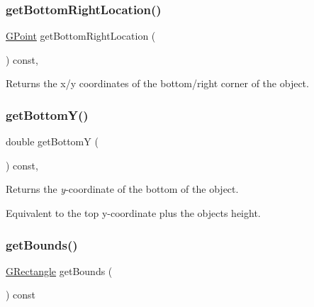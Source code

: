 \subsubsection{\texorpdfstring{get\+Bottom\+Right\+Location()}{getBottomRightLocation()}}
{\footnotesize\ttfamily \mbox{\hyperlink{classGPoint}{G\+Point}} get\+Bottom\+Right\+Location (\begin{DoxyParamCaption}{ }\end{DoxyParamCaption}) const\hspace{0.3cm}{\ttfamily [virtual]}, {\ttfamily [inherited]}}



Returns the x/y coordinates of the bottom/right corner of the object. 

\mbox{\label{classGObject_a4316a2406c18e1c6d061fe51fd355490}} 
\subsubsection{\texorpdfstring{get\+Bottom\+Y()}{getBottomY()}}
{\footnotesize\ttfamily double get\+BottomY (\begin{DoxyParamCaption}{ }\end{DoxyParamCaption}) const\hspace{0.3cm}{\ttfamily [virtual]}, {\ttfamily [inherited]}}



Returns the {\itshape y}-\/coordinate of the bottom of the object. 

Equivalent to the top y-\/coordinate plus the object\textquotesingle{}s height. \mbox{\label{classGText_a2f46ec8a3b533c690b3b3e56d4f34afe}} 
\subsubsection{\texorpdfstring{get\+Bounds()}{getBounds()}}
{\footnotesize\ttfamily \mbox{\hyperlink{classGRectangle}{G\+Rectangle}} get\+Bounds (\begin{DoxyParamCaption}{ }\end{DoxyParamCaption}) const\hspace{0.3cm}{\ttfamily [virtual]}}



